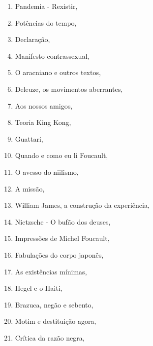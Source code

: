 {\begin{multicols}{2}
\begin{enumerate}
\item Pandemia - Rexistir, {}
\item Potências do tempo, {}
\item Declaração, {}
\item Manifesto contrassexual, {}
\item O aracniano e outros textos, {}
\item Deleuze, os movimentos aberrantes, {}
\item Aos nossos amigos, {}
\item Teoria King Kong, {}
\item Guattari, {}
\item Quando e como eu li Foucault, {}
\item O avesso do niilismo, {}
\item A missão, {}
\item William James, a construção da experiência, {}
\item Nietzsche - O bufão dos deuses, {}
\item Impressões de Michel Foucault, {}
\item Fabulações do corpo japonês, {}
\item As existências mínimas, {}
\item Hegel e o Haiti, {}
\item Brazuca, negão e sebento, {}
\item Motim e destituição agora, {}
\item Crítica da razão negra, {}

\end{enumerate}
\end{multicols}}
